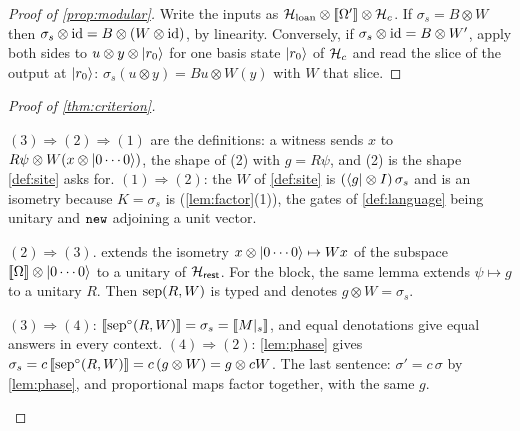 \documentclass[acmsmall,screen,review,anonymous,nonacm]{acmart}
\begin{document}
\begin{proof}[Proof of \cref{prop:modular}]
Write the inputs as $\mathcal{H}_{\mathrm{loan}} \otimes [\![\Omega']\!] \otimes \mathcal{H}_c$. If
$\sigma_s = B \otimes W$ then $\sigma_s \otimes \mathrm{id} = B \otimes (W \otimes
\mathrm{id})$, by linearity. Conversely, if $\sigma_s \otimes \mathrm{id} = B \otimes
W'$, apply both sides to $u \otimes y \otimes \lvert r_0 \rangle$ for one basis state
$\lvert r_0 \rangle$ of $\mathcal{H}_c$ and read the slice of the output at $\lvert r_0 \rangle$:
$\sigma_s(u \otimes y) = Bu \otimes W(y)$ with $W$ that slice.
\end{proof}

\begin{proof}[Proof of \cref{thm:criterion}]\leavevmode
\begin{steps}
\item $(3) \Rightarrow (2) \Rightarrow (1)$ are the definitions: a
  witness sends $x$ to $R\psi \otimes W(x \otimes \lvert 0\cdots0 \rangle)$, the shape
  of (2) with $g = R\psi$, and (2) is the shape \cref{def:site} asks for.
  $(1) \Rightarrow (2)$: the $W$ of
  \cref{def:site} is $(\langle g \rvert \otimes I)\,\sigma_s$ and is an isometry
  because $K = \sigma_s$ is (\cref{lem:factor}(1)), the gates of
  \cref{def:language} being unitary and $\texttt{new}$ adjoining a unit vector.
\item $(2) \Rightarrow (3)$.  extends the isometry
  $x \otimes \lvert 0\cdots0 \rangle \mapsto Wx$ of the subspace
  $[\![\Omega]\!] \otimes \lvert 0\cdots0 \rangle$ to a unitary of $\mathcal{H}_{\mathsf{rest}}$. For the block, the same lemma extends $\psi\mapsto g$ to a unitary $R$.
  Then $\mathrm{sep}(R,W)$ is typed and denotes $g\otimes W=\sigma_s$.
\item $(3) \Rightarrow (4)$: $[\![\mathrm{sep}^{\circ}(R,W)]\!] = \sigma_s = [\![M|_{s}]\!]$,
  and equal denotations give equal answers in every context.
  $(4) \Rightarrow (2)$: \cref{lem:phase} gives $\sigma_s = c\,[\![\mathrm{sep}^{\circ}(R,W)]\!]
  = c\,(g \otimes W) = g \otimes cW$. The last sentence: $\sigma' = c\,\sigma$ by
  \cref{lem:phase}, and proportional maps factor together, with the same $g$.
  \qedhere
\end{steps}
\end{proof}

\stmtComposite
\end{document}
